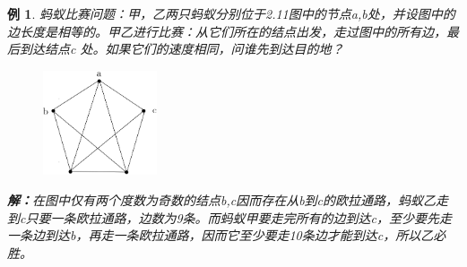 \documentclass[11pt,a4paper,openany]{book}
\newtheorem{sample}{\textbf{例}}[section]
\begin{document}
\begin{sample}
蚂蚁比赛问题：甲，乙两只蚂蚁分别位于2.11图中的节点a,b处，并设图中的边长度是相等的。甲乙进行比赛：从它们所在的结点出发，走过图中的所有边，最后到达结点c 处。如果它们的速度相同，问谁先到达目的地？\\
\begin{figure}[h]
  \centering
  \vspace{-20pt}
  \includegraphics[width=0.3\textwidth]{mayi.png}
  \caption{}
\end{figure}
\textbf{解：}在图中仅有两个度数为奇数的结点b,c因而存在从b到c的欧拉通路，蚂蚁乙走到c只要一条欧拉通路，边数为9条。而蚂蚁甲要走完所有的边到达c，至少要先走一条边到达b，再走一条欧拉通路，因而它至少要走10条边才能到达c，所以乙必胜。
\end{sample}
\end{document}
